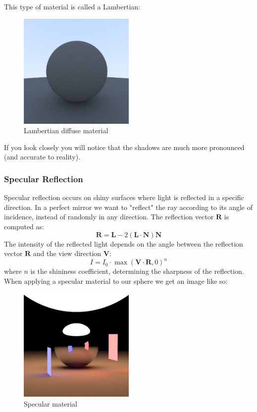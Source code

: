 \documentclass[12pt]{article}
\begin{document}
This type of material is called a Lambertian:

\begin{figure}[H]
    \centering
    \includegraphics[width=0.5\textwidth]{images/lambertian/lambertian_diffuse.png}
    \caption{Lambertian diffuse material}
    \label{fig:lambdiffmat}
\end{figure}

If you look closely you will notice that the shadows are much more pronounced (and accurate to reality).

\subsubsection{Specular Reflection}
Specular reflection occurs on shiny surfaces where light is reflected in a specific direction. In a perfect mirror we want to "reflect" the ray according to its angle of incidence, instead of randomly in any direction.
The reflection vector \(\mathbf{R}\) is computed as:
\[
    \mathbf{R} = \mathbf{L} - 2(\mathbf{L} \cdot \mathbf{N})\mathbf{N}
\]
The intensity of the reflected light depends on the angle between the reflection vector \(\mathbf{R}\) and the view direction \(\mathbf{V}\):
\[
    I = I_0 \cdot \max(\mathbf{V} \cdot \mathbf{R}, 0)^n
\]
where \(n\) is the shininess coefficient, determining the sharpness of the reflection. When applying a specular material to our sphere we get an image like so:

\begin{figure}[H]
    \centering
    \includegraphics[width=0.5\textwidth]{images/artsy_rep/specular_sphere.png}
    \caption{Specular material}
    \label{fig:specmat}
\end{figure}
\end{document}
